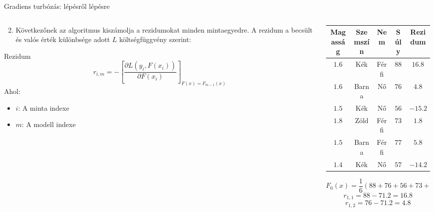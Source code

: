 \documentclass[english, aspectratio=169]{beamer}
\begin{document}
\begin{frame}{Gradiens turbózás: lépésről lépésre}
\begin{columns}
\begin{column}{.45\textwidth}
\begin{enumerate}
	\setcounter{enumi}{1}
	\item Következőnek az algoritmus kiszámolja a rezidumokat minden mintaegyedre. A rezidum a becsült és valós érték különbsége adott $L$ költségfüggvény szerint:
\end{enumerate}
	\begin{block}{Rezidum}
	\[
	r_{i,m} = -\left[ \frac{\partial L\left(y_i, F\left(x_i\right)\right)}{\partial F \left( x_i \right)} \right]_{F\left( x \right) = F_{m-1}\left( x \right)}
	\]
	Ahol:
	\begin{itemize}
		\item $i$: A minta indexe
		\item $m$: A modell indexe
	\end{itemize}
	\end{block}
\end{column}
\begin{column}{.55\textwidth}
\begin{center}
\begin{small}
\begin{tabular}{|c|c|c|c|c|}
\hline
Magasság & Szemszín & Nem & Súly & Rezidum \\ \hline
$1.6$      & Kék      & Férfi & $88$  & $16.8$   \\ \hline
$1.6$      & Barna    & Nő    & $76$  & $4.8$    \\ \hline
$1.5$      & Kék      & Nő    & $56$  & $-15.2$  \\ \hline
$1.8$      & Zöld     & Férfi & $73$  & $1.8$    \\ \hline
$1.5$      & Barna    & Férfi & $77$  & $5.8$    \\ \hline
$1.4$      & Kék      & Nő    & $57$  & $-14.2$  \\ \hline
\end{tabular}
\end{small}
\[
F_0(x) = \frac{1}{6} \left( 88+76+56+73+77+57 \right) = 71.2
\]
\[
r_{1,1} = 88 - 71.2 = 16.8
\]
\[
r_{1,2} = 76 - 71.2 = 4.8
\]
\end{center}
\end{column}
\end{columns}
\end{frame}
\end{document}
